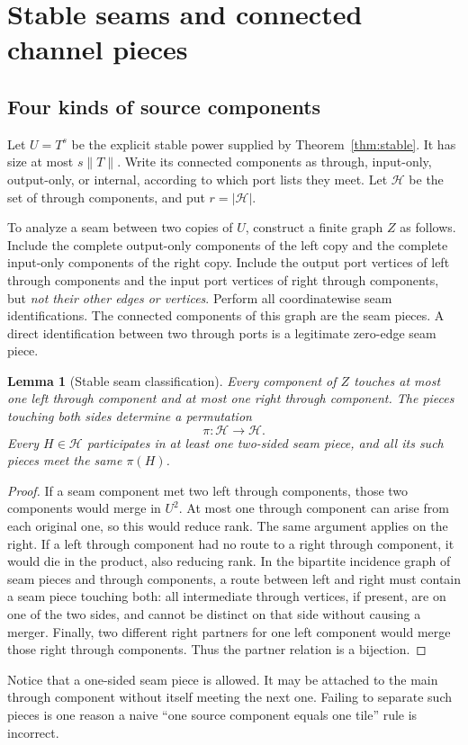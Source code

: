\documentclass[11pt]{article}
\newtheorem{lemma}[theorem]{Lemma}
\theoremstyle{remark}\newtheorem{remark}[theorem]{Remark}
\newcommand{\size}[1]{\lVert #1\rVert}
\begin{document}
\section{Stable seams and connected channel pieces}
\subsection{Four kinds of source components}
Let $U=T^s$ be the explicit stable power supplied by Theorem~\ref{thm:stable}. It has size at most $s\size{T}$. Write its connected components as through, input-only, output-only, or internal, according to which port lists they meet. Let $\mathcal H$ be the set of through components, and put $r=|\mathcal H|$.

To analyze a seam between two copies of $U$, construct a finite graph $Z$ as follows. Include the complete output-only components of the left copy and the complete input-only components of the right copy. Include the output port vertices of left through components and the input port vertices of right through components, but \emph{not their other edges or vertices}. Perform all coordinatewise seam identifications. The connected components of this graph are the seam pieces. A direct identification between two through ports is a legitimate zero-edge seam piece.

\begin{lemma}[Stable seam classification]\label{lem:seam}
Every component of $Z$ touches at most one left through component and at most one right through component. The pieces touching both sides determine a permutation
\[
 \pi:\mathcal H\longrightarrow\mathcal H.
\]
Every $H\in\mathcal H$ participates in at least one two-sided seam piece, and all its such pieces meet the same $\pi(H)$.
\end{lemma}
\begin{proof}
If a seam component met two left through components, those two components would merge in $U^2$. At most one through component can arise from each original one, so this would reduce rank. The same argument applies on the right. If a left through component had no route to a right through component, it would die in the product, also reducing rank. In the bipartite incidence graph of seam pieces and through components, a route between left and right must contain a seam piece touching both: all intermediate through vertices, if present, are on one of the two sides, and cannot be distinct on that side without causing a merger. Finally, two different right partners for one left component would merge those right through components. Thus the partner relation is a bijection.
\end{proof}
Notice that a one-sided seam piece is allowed. It may be attached to the main through component without itself meeting the next one. Failing to separate such pieces is one reason a naive ``one source component equals one tile'' rule is incorrect.
\end{document}

